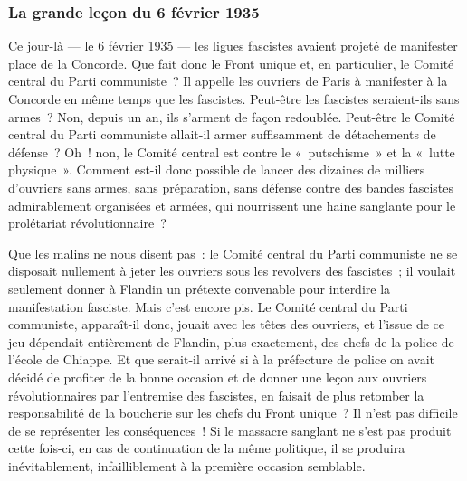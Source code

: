 \documentclass[french,twoside]{book} %
\begin{document}
\subsubsection[{La grande leçon du 6 février 1935}]{La grande leçon du 6 février 1935}
\noindent Ce jour-là — le 6 février 1935 — les ligues fascistes avaient projeté de manifester place de la Concorde. Que fait donc le Front unique et, en particulier, le Comité central du Parti communiste ? Il appelle les ouvriers de Paris à manifester à la Concorde en même temps que les fascistes. Peut-être les fascistes seraient-ils sans armes ? Non, depuis un an, ils s’arment de façon redoublée. Peut-être le Comité central du Parti communiste allait-il armer suffisamment de détachements de défense ? Oh ! non, le Comité central est contre le « putschisme » et la « lutte physique ». Comment est-il donc possible de lancer des dizaines de milliers d’ouvriers sans armes, sans préparation, sans défense contre des bandes fascistes admirablement organisées et armées, qui nourrissent une haine sanglante pour le prolétariat révolutionnaire ?\par
 Que les malins ne nous disent pas : le Comité central du Parti communiste ne se disposait nullement à jeter les ouvriers sous les revolvers des fascistes ; il voulait seulement donner à Flandin un prétexte convenable pour interdire la manifestation fasciste. Mais c’est encore pis. Le Comité central du Parti communiste, apparaît-il donc, jouait avec les têtes des ouvriers, et l’issue de ce jeu dépendait entièrement de Flandin, plus exactement, des chefs de la police de l’école de Chiappe. Et que serait-il arrivé si à la préfecture de police on avait décidé de profiter de la bonne occasion et de donner une leçon aux ouvriers révolutionnaires par l’entremise des fascistes, en faisait de plus retomber la responsabilité de la boucherie sur les chefs du Front unique ? Il n’est pas difficile de se représenter les conséquences ! Si le massacre sanglant ne s’est pas produit cette fois-ci, en cas de continuation de la même politique, il se produira inévitablement, infailliblement à la première occasion semblable.
\end{document}
